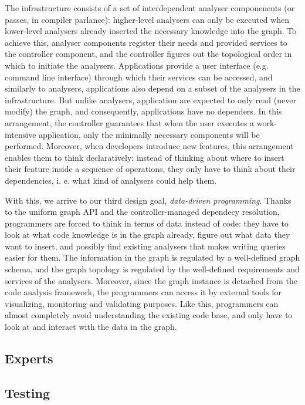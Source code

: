 \documentclass[sigconf]{acmart}
\begin{document}
The infrastructure consists of a set of interdependent analyser componenents (or passes, in compiler parlance): higher-level analysers can only be executed when lower-level analysers already inserted the necessary knowledge into the graph. To achieve this, analyser components register their needs and provided services to the controller component, and the controller figures out the topological order in which to initiate the analysers. 
Applications provide a user interface (e.g. command line interface) through which their services can be accessed, and similarly to analysers, applications also depend on a subset of the analysers in the infrastructure. But unlike analysers, application are expected to only read (never modify) the graph, and consequently, applications have no dependers. 
In this arrangement, the controller guarantees that when the user executes a work-intensive application, only the minimally necessary components will be performed.
Moreover, when developers introduce new features, this arrangement enables them to think declaratively: instead of thinking about where to insert their feature inside a sequence of operations, they only have to think about their dependencies, i. e. what kind of analysers could help them.

With this, we arrive to our third design goal, \textit{data-driven programming}. Thanks to the uniform graph API and the controller-managed dependecy resolution, programmers are forced to think in terms of data instead of code: they have to look at what code knowledge is in the graph already, figure out what data they want to insert, and possibly find existing analysers that makes writing queries  easier for them. 
The information in the graph is regulated by a well-defined graph schema, and the graph topology is regulated by the well-defined requirements and services of the analysers. Moreover, since the graph instance is detached from the code analysis framework, the programmers can access it by external tools for visualizing, monitoring and validating purposes.
Like this, programmers can almost completely avoid understanding the existing code base, and only have to look at and interact with the data in the graph.  
	
	\subsection{Experts} %

	\subsection{Testing} %
	
\end{document}
